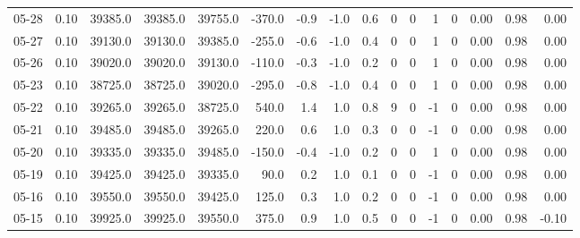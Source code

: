 \begin{threeparttable}
{\begin{tabular}{lrrrrrrrrrrrrrrr}
  05-28 &     0.10 & 39385.0 & 39385.0 & 39755.0 &     -370.0 &           -0.9 &                     -1.0 &                 0.6 &              0 &         0 &     1 &         0 &       0.00 &      0.98 &           0.00 \\
  05-27 &     0.10 & 39130.0 & 39130.0 & 39385.0 &     -255.0 &           -0.6 &                     -1.0 &                 0.4 &              0 &         0 &     1 &         0 &       0.00 &      0.98 &           0.00 \\
  05-26 &     0.10 & 39020.0 & 39020.0 & 39130.0 &     -110.0 &           -0.3 &                     -1.0 &                 0.2 &              0 &         0 &     1 &         0 &       0.00 &      0.98 &           0.00 \\
  05-23 &     0.10 & 38725.0 & 38725.0 & 39020.0 &     -295.0 &           -0.8 &                     -1.0 &                 0.4 &              0 &         0 &     1 &         0 &       0.00 &      0.98 &           0.00 \\
  05-22 &     0.10 & 39265.0 & 39265.0 & 38725.0 &      540.0 &            1.4 &                      1.0 &                 0.8 &              9 &         0 &    -1 &         0 &       0.00 &      0.98 &           0.00 \\
  05-21 &     0.10 & 39485.0 & 39485.0 & 39265.0 &      220.0 &            0.6 &                      1.0 &                 0.3 &              0 &         0 &    -1 &         0 &       0.00 &      0.98 &           0.00 \\
  05-20 &     0.10 & 39335.0 & 39335.0 & 39485.0 &     -150.0 &           -0.4 &                     -1.0 &                 0.2 &              0 &         0 &     1 &         0 &       0.00 &      0.98 &           0.00 \\
  05-19 &     0.10 & 39425.0 & 39425.0 & 39335.0 &       90.0 &            0.2 &                      1.0 &                 0.1 &              0 &         0 &    -1 &         0 &       0.00 &      0.98 &           0.00 \\
  05-16 &     0.10 & 39550.0 & 39550.0 & 39425.0 &      125.0 &            0.3 &                      1.0 &                 0.2 &              0 &         0 &    -1 &         0 &       0.00 &      0.98 &           0.00 \\
  05-15 &     0.10 & 39925.0 & 39925.0 & 39550.0 &      375.0 &            0.9 &                      1.0 &                 0.5 &              0 &         0 &    -1 &         0 &       0.00 &      0.98 &          -0.10 \\

\end{tabular}}
\end{threeparttable}
